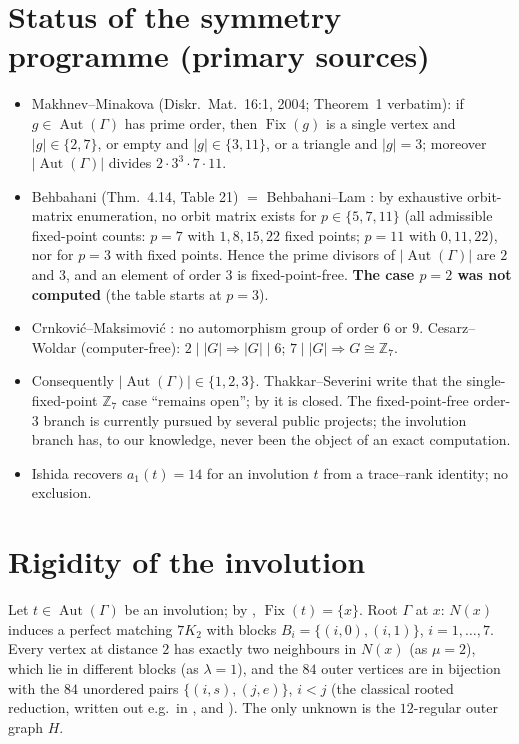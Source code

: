 \documentclass[11pt,a4paper]{article}
\theoremstyle{remark}
\newcommand{\Z}{\mathbb{Z}}
\newcommand{\Fix}{\operatorname{Fix}}
\begin{document}
\section{Status of the symmetry programme (primary sources)}
\begin{itemize}[nosep]
\item Makhnev--Minakova \cite{MM04} (Diskr.\ Mat.\ 16:1, 2004; Theorem~1 verbatim): if $g\in\operatorname{Aut}(\Gamma)$ has prime order, then
$\Fix(g)$ is a single vertex and $|g|\in\{2,7\}$, or empty and $|g|\in\{3,11\}$, or a triangle and $|g|=3$; moreover $|\!\operatorname{Aut}(\Gamma)|$ divides $2\cdot3^3\cdot7\cdot11$.
\item Behbahani \cite{Beh09} (Thm.\ 4.14, Table 21) $=$ Behbahani--Lam \cite{BL11}: by exhaustive orbit-matrix enumeration, no orbit matrix exists for
$p\in\{5,7,11\}$ (all admissible fixed-point counts: $p=7$ with $1,8,15,22$ fixed points; $p=11$ with $0,11,22$), nor for $p=3$ with fixed points.
Hence the prime divisors of $|\!\operatorname{Aut}(\Gamma)|$ are $2$ and $3$, and an element of order $3$ is fixed-point-free. \textbf{The case $p=2$ was not computed} (the table starts at $p=3$).
\item Crnković--Maksimović \cite{CM20}: no automorphism group of order $6$ or $9$. Cesarz--Woldar \cite{CW25} (computer-free): $2\mid|G|\Rightarrow |G|\mid 6$; $7\mid|G|\Rightarrow G\cong\Z_7$.
\item Consequently $|\!\operatorname{Aut}(\Gamma)|\in\{1,2,3\}$. Thakkar--Severini \cite{TS26} write that the single-fixed-point $\Z_7$ case ``remains open'';
by \cite{Beh09,BL11} it is closed. The fixed-point-free order-$3$ branch is currently pursued by several public projects; the involution branch has,
to our knowledge, never been the object of an exact computation.
\item Ishida \cite{Ish26} recovers $a_1(t)=14$ for an involution $t$ from a trace--rank identity; no exclusion.
\end{itemize}

\section{Rigidity of the involution}
Let $t\in\operatorname{Aut}(\Gamma)$ be an involution; by \cite{MM04}, $\Fix(t)=\{x\}$. Root $\Gamma$ at $x$: $N(x)$ induces a perfect matching $7K_2$ with
blocks $B_i=\{(i,0),(i,1)\}$, $i=1,\dots,7$. Every vertex at distance $2$ has exactly two neighbours in $N(x)$ (as $\mu=2$), which lie in different blocks
(as $\lambda=1$), and the $84$ outer vertices are in bijection with the $84$ unordered pairs $\{(i,s),(j,e)\}$, $i<j$ (the classical rooted reduction, written out e.g.\ in \cite{CW25}, \cite{Ker26} and
\cite{TS26}). The only unknown is the $12$-regular outer graph $H$.
\end{document}
